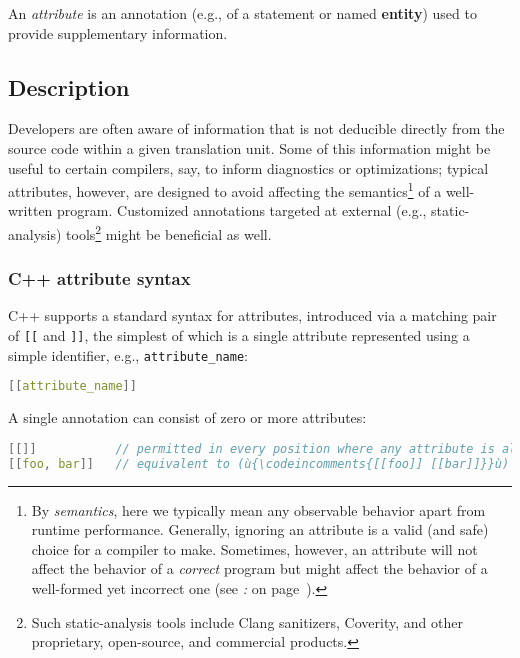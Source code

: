 


An \emph{attribute} is an annotation (e.g., of a statement or named
\textbf{entity}) used to provide supplementary information.

\subsection[Description]{Description}\label{description}

Developers are often aware of information that is not deducible directly
from the source code within a given translation unit. Some of this
information might be useful to certain compilers, say, to inform
diagnostics or optimizations; typical attributes, however, are designed
to avoid affecting the semantics{\cprotect\footnote{By \emph{semantics}, here
we typically mean any observable behavior apart from runtime
performance. Generally, ignoring an attribute is a valid (and safe)
choice for a compiler to make. Sometimes, however, an
attribute will not affect the behavior of a \emph{correct} program but might affect the behavior of a well-formed yet incorrect one (see
  {\it{}:} {\it{}} on page~\pageref{delineating-explicit-assumptions-in-code-to-achieve-better-optimizations}).}} of a
well-written program. Customized annotations targeted at external (e.g.,
static-analysis) tools{\cprotect\footnote{Such static-analysis tools include Clang sanitizers, Coverity, and other
  proprietary, open-source, and commercial products.}} might be
beneficial as well.

\subsubsection[C++ attribute syntax]{C++ attribute syntax}\label{c++-attribute-syntax}

C++ supports a standard syntax for attributes, introduced via a matching
pair of \texttt{[[} and \texttt{]]}, the simplest of which is a single
attribute represented using a simple identifier, e.g.,
\texttt{attribute\_name}:

\begin{lstlisting}[language=C++]
[[attribute_name]]
\end{lstlisting}
    
\noindent A single annotation can consist of zero or more attributes:

\begin{lstlisting}[language=C++]
[[]]           // permitted in every position where any attribute is allowed
[[foo, bar]]   // equivalent to (ù{\codeincomments{[[foo]] [[bar]]}}ù)
\end{lstlisting}
    

